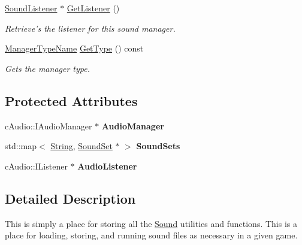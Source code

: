 \begin{DoxyCompactItemize}
\hyperlink{classphys_1_1SoundListener}{SoundListener} $\ast$ \hyperlink{classphys_1_1SoundManager_af0c700e283c44c20466185e1150fc6a3}{GetListener} ()
\begin{DoxyCompactList}\small\item\em Retrieve's the listener for this sound manager. \item\end{DoxyCompactList}\item 
\hyperlink{classphys_1_1ManagerBase_aaa6ccddf23892eaccb898529414f80a5}{ManagerTypeName} \hyperlink{classphys_1_1SoundManager_a6815f78a6170b119e2d1d24e862ffbf8}{GetType} () const 
\begin{DoxyCompactList}\small\item\em Gets the manager type. \item\end{DoxyCompactList}\end{DoxyCompactItemize}
\subsection*{Protected Attributes}
\begin{DoxyCompactItemize}
\item 
\hypertarget{classphys_1_1SoundManager_a16bf0c35e031e2359d27c6b12536c98d}{
cAudio::IAudioManager $\ast$ {\bfseries AudioManager}}
\label{d1/dc4/classphys_1_1SoundManager_a16bf0c35e031e2359d27c6b12536c98d}

\item 
\hypertarget{classphys_1_1SoundManager_a7a8e89ec9886d28cf6331930b4269fb3}{
std::map$<$ \hyperlink{namespacephys_aa03900411993de7fbfec4789bc1d392e}{String}, \hyperlink{namespacephys_ab780c3162da5699fe421f3739ba03fc4}{SoundSet} $\ast$ $>$ {\bfseries SoundSets}}
\label{d1/dc4/classphys_1_1SoundManager_a7a8e89ec9886d28cf6331930b4269fb3}

\item 
\hypertarget{classphys_1_1SoundManager_a5b882ae37b8fbe843eee1f865be72a51}{
cAudio::IListener $\ast$ {\bfseries AudioListener}}
\label{d1/dc4/classphys_1_1SoundManager_a5b882ae37b8fbe843eee1f865be72a51}

\end{DoxyCompactItemize}


\subsection{Detailed Description}
This is simply a place for storing all the \hyperlink{classphys_1_1Sound}{Sound} utilities and functions. This is a place for loading, storing, and running sound files as necessary in a given game. 

